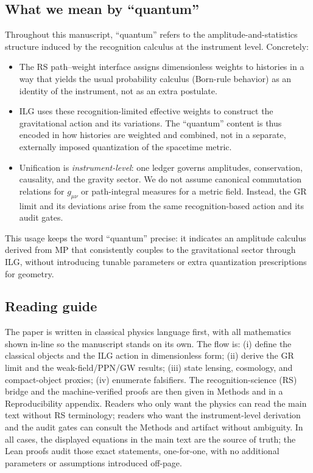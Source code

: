 \documentclass[12pt,a4paper]{article}
\begin{document}
\subsection{What we mean by ``quantum''}
Throughout this manuscript, “quantum” refers to the amplitude-and-statistics structure induced by the recognition calculus at the instrument level. Concretely:
\begin{itemize}
  \item The RS path–weight interface assigns dimensionless weights to histories in a way that yields the usual probability calculus (Born-rule behavior) as an identity of the instrument, not as an extra postulate.
  \item ILG uses these recognition-limited effective weights to construct the gravitational action and its variations. The “quantum” content is thus encoded in how histories are weighted and combined, not in a separate, externally imposed quantization of the spacetime metric.
  \item Unification is \emph{instrument-level}: one ledger governs amplitudes, conservation, causality, and the gravity sector. We do not assume canonical commutation relations for $g_{\mu\nu}$ or path-integral measures for a metric field. Instead, the GR limit and its deviations arise from the same recognition-based action and its audit gates.
\end{itemize}
This usage keeps the word “quantum” precise: it indicates an amplitude calculus derived from MP that consistently couples to the gravitational sector through ILG, without introducing tunable parameters or extra quantization prescriptions for geometry.

\subsection{Reading guide}
The paper is written in classical physics language first, with all mathematics shown in-line so the manuscript stands on its own. The flow is: (i) define the classical objects and the ILG action in dimensionless form; (ii) derive the GR limit and the weak-field/PPN/GW results; (iii) state lensing, cosmology, and compact-object proxies; (iv) enumerate falsifiers. The recognition-science (RS) bridge and the machine-verified proofs are then given in Methods and in a Reproducibility appendix. Readers who only want the physics can read the main text without RS terminology; readers who want the instrument-level derivation and the audit gates can consult the Methods and artifact without ambiguity. In all cases, the displayed equations in the main text are the source of truth; the Lean proofs audit those exact statements, one-for-one, with no additional parameters or assumptions introduced off-page.
\end{document}

